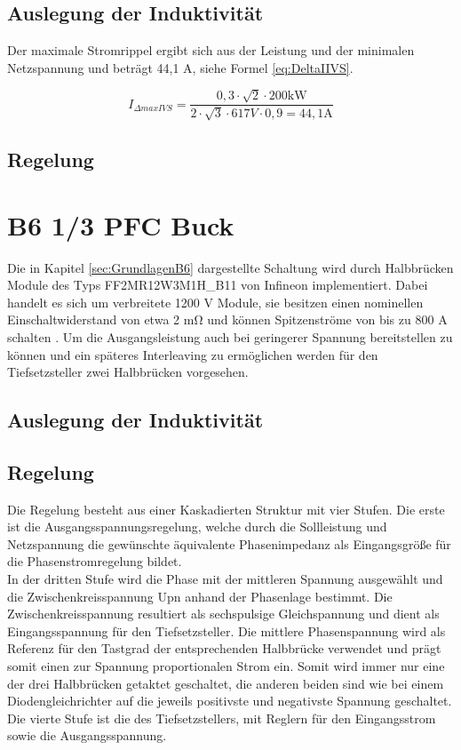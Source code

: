 	\cite{IAF99}
	
	\subsection{Auslegung der Induktivität}
	Der maximale Stromrippel ergibt sich aus der Leistung und der minimalen Netzspannung und beträgt 44,1 \si{\A}, siehe Formel \ref{eq:DeltaIIVS}.
	
	\begin{equation}
	\label{eq:DeltaIIVS}
	I_{\Delta max IVS}= \dfrac{0,3\cdot \sqrt{2} \cdot 200 \si{\kilo \watt}}{2 \cdot \sqrt{3} \cdot 617 \si{V} \cdot 0,9 = 44,1 \si{\A}}
	\end{equation}
	
	\subsection{Regelung}
	




\section{B6 1/3 PFC Buck}
Die in Kapitel \ref{sec:GrundlagenB6} dargestellte Schaltung wird durch Halbbrücken Module des Typs FF2MR12W3M1H\_B11 von Infineon implementiert. Dabei handelt es sich um verbreitete 1200 \si{\volt} Module, sie besitzen einen nominellen Einschaltwiderstand von etwa 2 \si{\milli \ohm} und können Spitzenströme von bis zu 800 \si{\ampere} schalten \cite{IFAGFF2}. Um die Ausgangsleistung auch bei geringerer Spannung bereitstellen zu können und ein späteres Interleaving zu ermöglichen werden für den Tiefsetzsteller zwei Halbbrücken vorgesehen.

\subsection{Auslegung der Induktivität}


\subsection{Regelung}
Die Regelung besteht aus einer Kaskadierten Struktur mit vier Stufen. Die erste ist die Ausgangsspannungsregelung, welche durch die Sollleistung und Netzspannung die gewünschte äquivalente Phasenimpedanz als Eingangsgröße für die Phasenstromregelung bildet.\\
In der dritten Stufe wird die Phase mit der mittleren Spannung ausgewählt und die Zwischenkreisspannung \gls{Upn} anhand der Phasenlage bestimmt. Die Zwischenkreisspannung resultiert als sechspulsige Gleichspannung und dient als Eingangsspannung für den Tiefsetzsteller. Die mittlere Phasenspannung wird als Referenz für den Tastgrad der entsprechenden Halbbrücke verwendet und prägt somit einen zur Spannung proportionalen Strom ein. Somit wird immer nur eine der drei Halbbrücken getaktet geschaltet, die anderen beiden sind wie bei einem Diodengleichrichter auf die jeweils positivste und negativste Spannung geschaltet.\\
Die vierte Stufe ist die des Tiefsetzstellers, mit Reglern für den Eingangsstrom sowie die Ausgangsspannung.

